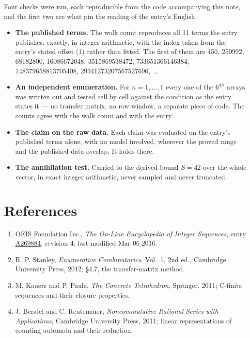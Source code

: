 \documentclass[11pt]{article}
\theoremstyle{definition}
\begin{document}
Four checks were run, each reproducible from the code accompanying this note, and the first two are what pin the reading of the entry's English.

\begin{itemize}

\item {\bfseries The published terms.} The walk count reproduces all 11 terms the entry publishes, exactly, in integer arithmetic, with the index taken from the entry's stated offset (1) rather than fitted. The first of them are 450, 250992, 68182800, 16086672048, 3515869538472, 733651366146384, 148379658813705408, 29341273207567527696,~\dots

\item {\bfseries An independent enumeration.} For $n = 1,\dots,1$ every one of the $6^{4n}$ arrays was written out and tested cell by cell against the condition as the entry states it --- no transfer matrix, no row window, a separate piece of code. The counts agree with the walk count and with the entry.

\item {\bfseries The claim on the raw data.} Each claim was evaluated on the entry's published terms alone, with no model involved, wherever the proved range and the published data overlap. It holds there.

\item {\bfseries The annihilation test.} Carried to the derived bound $S = 42$ over the whole vector, in exact integer arithmetic, never sampled and never truncated.

\end{itemize}

\section{References}

\begin{enumerate}

\item OEIS Foundation Inc., \emph{The On-Line Encyclopedia of Integer Sequences}, entry \href{https://oeis.org/A269884}{A269884}, revision 4, last modified Mar 06 2016.

\item R. P. Stanley, \emph{Enumerative Combinatorics}, Vol.~1, 2nd ed., Cambridge University Press, 2012; \S4.7, the transfer-matrix method.

\item M. Kauers and P. Paule, \emph{The Concrete Tetrahedron}, Springer, 2011; C-finite sequences and their closure properties.

\item J. Berstel and C. Reutenauer, \emph{Noncommutative Rational Series with Applications}, Cambridge University Press, 2011; linear representations of counting automata and their reduction.

\end{enumerate}
\end{document}
